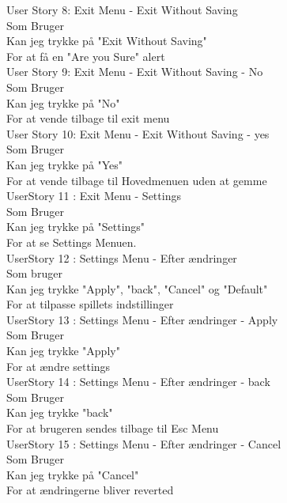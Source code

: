 User Story 8: Exit Menu - Exit Without Saving\\
  Som Bruger \\
  Kan jeg trykke på "Exit Without Saving"\\
  For at få en "Are you Sure" alert\\

User Story 9: Exit Menu - Exit Without Saving - No\\
  Som Bruger\\
  Kan jeg trykke på "No" \\
  For at vende tilbage til exit menu\\

User Story 10: Exit Menu - Exit Without Saving - yes\\
  Som Bruger\\
  Kan jeg trykke på "Yes" \\
  For at vende tilbage til Hovedmenuen uden at gemme\\

UserStory 11 : Exit Menu - Settings\\
  Som Bruger \\
  Kan jeg trykke på "Settings" \\
  For at se Settings Menuen.\\


UserStory 12 : Settings Menu - Efter ændringer\\
  Som bruger \\
  Kan jeg trykke "Apply", "back", "Cancel" og "Default"\\
  For at tilpasse spillets indstillinger\\

UserStory 13 : Settings Menu - Efter ændringer - Apply\\
  Som Bruger \\
  Kan jeg  trykke "Apply" \\
  For at ændre settings\\

UserStory 14 : Settings Menu - Efter ændringer - back\\
  Som Bruger \\
  Kan jeg trykke "back" \\
  For at brugeren sendes tilbage til Esc Menu\\

UserStory 15 : Settings Menu - Efter ændringer - Cancel\\
  Som Bruger \\
  Kan jeg trykke på "Cancel" \\
  For at ændringerne bliver reverted\\

